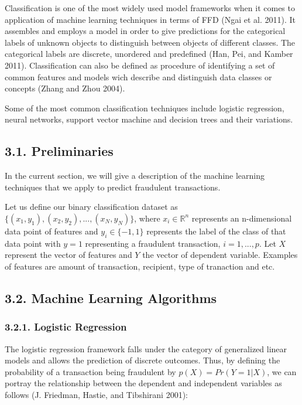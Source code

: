\documentclass[12pt,]{article}
\begin{document}
Classification is one of the most widely used model frameworks when it
comes to application of machine learning techniques in terms of FFD
(Ngai et al. 2011). It assembles and employs a model in order to give
predictions for the categorical labels of unknown objects to distinguish
between objects of different classes. The categorical labels are
discrete, unordered and predefined (Han, Pei, and Kamber 2011).
Classification can also be defined as procedure of identifying a set of
common features and models wich describe and distinguish data classes or
concepts (Zhang and Zhou 2004).

Some of the most common classification techniques include logistic
regression, neural networks, support vector machine and decision trees
and their variations.

\hypertarget{preliminaries}{%
\subsection{3.1. Preliminaries}\label{preliminaries}}

In the current section, we will give a description of the machine
learning techniques that we apply to predict fraudulent transactions.

Let us define our binary classification dataset as
\({\{(x_1,y_1),(x_2,y_2),...,(x_N,y_N)\}}\), where
\(x_i\in \mathbb{R}^n\) represents an n-dimensional data point of
features and \(y_i \in \{-1,1\}\) represents the label of the class of
that data point with \(y=1\) representing a fraudulent transaction,
\(i = 1,...,p\). Let \(X\) represent the vector of features and \(Y\)
the vector of dependent variable. Examples of features are amount of
transaction, recipient, type of tranaction and etc.

\hypertarget{machine-learning-algorithms}{%
\subsection{3.2. Machine Learning
Algorithms}\label{machine-learning-algorithms}}

\hypertarget{logistic-regression}{%
\subsubsection{3.2.1. Logistic Regression}\label{logistic-regression}}

The logistic regression framework falls under the category of
generalized linear models and allows the prediction of discrete
outcomes. Thus, by defining the probability of a transaction being
fraudulent by \(p(X) = Pr(Y=1|X)\), we can portray the relationship
between the dependent and independent variables as follows (J. Friedman,
Hastie, and Tibshirani 2001):
\end{document}
